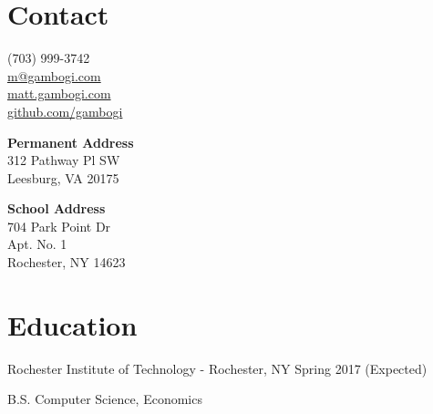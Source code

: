 \documentclass[letter,margin,line]{resume}
\newcommand{\rdate}[1]{\hfill {\small #1}}
\begin{document}
    \begin{resume}
        \section{\mysidestyle Contact} \vspace{2mm}

        \begin{multicols}{3}
                  (703) 999-3742 \\
                  \href{mailto:m@gambogi.com}{m@gambogi.com} \\
                  \href{http://matt.gambogi.com}{matt.gambogi.com} \\
                  \href{https://github.com/gambogi}{github.com/gambogi}

            \columnbreak
            {\bf Permanent Address} \\
                  312 Pathway Pl SW \\
                  Leesburg, VA 20175

            \columnbreak
            {\bf School Address} \\
                   704 Park Point Dr \\
                   Apt. No. 1 \\
                   Rochester, NY 14623 

        \end{multicols}
        \section{\mysidestyle Education}
        \begin{compactdesc}
        \item[Rochester Institute of Technology] - Rochester, NY
            \rdate{Spring 2017 (Expected)}
        \item B.S. Computer Science, Economics
        \end{compactdesc}


\end{resume}
\end{document}
